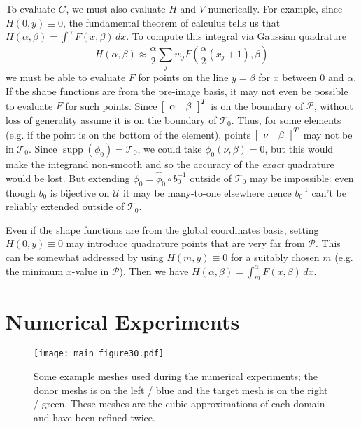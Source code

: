 \documentclass[letterpaper,10pt]{article}
\theoremstyle{definition}
\newcommand{\utri}{\mathcal{U}}
\begin{document}
To evaluate \(G\), we must also evaluate \(H\) and \(V\) numerically.
For example, since \(H(0, y) \equiv 0\),
the fundamental theorem of calculus tells us that
\(H\left(\alpha, \beta\right) = \int_0^{\alpha} F\left(x, \beta\right) \, dx\).
To compute this integral via Gaussian quadrature
\begin{equation}
H\left(\alpha, \beta\right) \approx \frac{\alpha}{2} \sum_j w_j
  F\left(\frac{\alpha}{2} (x_j + 1), \beta\right)
\end{equation}
we must be able to evaluate \(F\) for
points on the line \(y = \beta\) for \(x\) between \(0\) and \(\alpha\). If
the shape functions are from the pre-image basis, it may not even be possible
to evaluate \(F\) for such points. Since \(\left[\begin{array}{c c} \alpha &
\beta \end{array}\right]^T\) is on the boundary of \(\mathcal{P}\), without
loss of generality
assume it is on the boundary of \(\mathcal{T}_0\). Thus, for some elements
(e.g. if the point is on the bottom of the element), points
\(\left[\begin{array}{c c} \nu & \beta \end{array}\right]^T\) may not be
in \(\mathcal{T}_0\). Since \(\operatorname{supp}(\phi_0) = \mathcal{T}_0\),
we could take \(\phi_0(\nu, \beta) = 0\), but this would make the integrand
non-smooth and so the accuracy of the \emph{exact} quadrature would be
lost. But extending \(\phi_0 = \widehat{\phi}_0 \circ b_0^{-1}\) outside
of \(\mathcal{T}_0\) may be impossible: even though \(b_0\) is bijective on
\(\utri\) it may be many-to-one elsewhere hence \(b_0^{-1}\) can't be
reliably extended outside of \(\mathcal{T}_0\).

Even if the shape functions are from the global coordinates basis,
setting \(H(0, y) \equiv 0\) may introduce quadrature points that
are very far from \(\mathcal{P}\). This can be somewhat addressed by using
\(H(m, y) \equiv 0\) for a suitably chosen \(m\) (e.g. the minimum
\(x\)-value in \(\mathcal{P}\)). Then we have
\(H\left(\alpha, \beta\right) = \int_m^{\alpha} F\left(x, \beta\right) \, dx\).

\section{Numerical Experiments}

\begin{figure}
  \texttt{[image: main\_figure30.pdf]}
  \centering
  \captionsetup{width=.75\linewidth}
  \caption{Some example meshes used during the numerical
    experiments; the donor meshs is on the left / blue and the target
    mesh is on the right / green. These meshes are the cubic approximations
    of each domain and have been refined twice.}
  \label{fig:meshes-used-refined}
\end{figure}
\end{document}
